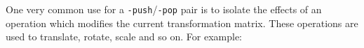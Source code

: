 \documentclass{book}
\begin{document}
\bigskip
\ifdefined\HCode
{}
\else
{}
\fi
\bigskip

\noindent One very common use for a \texttt{-push}/\texttt{-pop} pair is to isolate the effects of an operation which modifies the current transformation matrix. These operations are used to translate, rotate, scale and so on. For example: 
\end{document}
